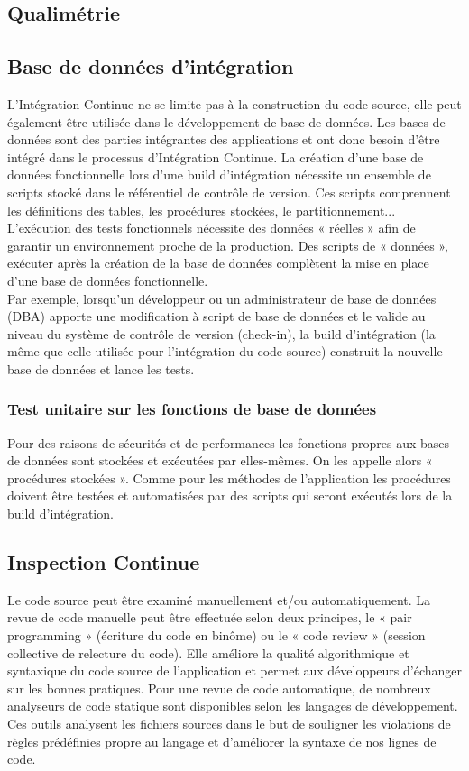 \documentclass{report}
\begin{document}
      \subsection{Qualimétrie}

      \subsection{Base de données d’intégration}
      L’Intégration Continue ne se limite pas à la construction du code source, elle peut également être utilisée dans le développement de base de données. Les bases de données sont des parties intégrantes des applications et ont donc besoin d’être intégré dans le processus d’Intégration Continue. La création d’une base de données fonctionnelle lors d’une build d’intégration nécessite un ensemble de scripts stocké dans le référentiel de contrôle de version. Ces scripts comprennent les définitions des tables, les procédures stockées, le partitionnement... L’exécution des tests fonctionnels nécessite des données « réelles » afin de garantir un environnement proche de la production. Des scripts de « données », exécuter après la création de la base de données complètent la mise en place d’une base de données fonctionnelle.\\

      Par exemple, lorsqu’un développeur ou un administrateur de base de données (DBA) apporte une modification à script de base de données et le valide au niveau du système de contrôle de version (check-in), la build d’intégration (la même que celle utilisée pour l’intégration du code source) construit la nouvelle base de données et lance les tests.

      \subsubsection{Test unitaire sur les fonctions de base de données}
      Pour des raisons de sécurités et de performances les fonctions propres aux bases de données sont stockées et exécutées par elles-mêmes. On les appelle alors « procédures stockées ». Comme pour les méthodes de l’application les procédures doivent être testées et automatisées par des scripts qui seront exécutés lors de la build d’intégration.

      \subsection{Inspection Continue}
      Le code source peut être examiné manuellement et/ou automatiquement. La revue de code manuelle peut être effectuée selon deux principes, le « pair programming » (écriture du code en binôme) ou le « code review » (session collective de relecture du code). Elle améliore la qualité algorithmique et syntaxique du code source de l’application et permet aux développeurs d’échanger sur les bonnes pratiques. Pour une revue de code automatique, de nombreux analyseurs de code statique sont disponibles selon les langages de développement. Ces outils analysent les fichiers sources dans le but de souligner les violations de règles prédéfinies propre au langage et d’améliorer la syntaxe de nos lignes de code.\\
\end{document}
